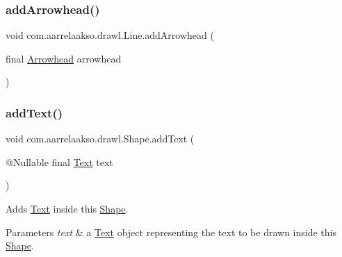 \mbox{\label{classcom_1_1aarrelaakso_1_1drawl_1_1_line_a7c54922855fda2590c962ac8e03c220c}} 
\subsubsection{\texorpdfstring{add\+Arrowhead()}{addArrowhead()}}
{\footnotesize\ttfamily void com.\+aarrelaakso.\+drawl.\+Line.\+add\+Arrowhead (\begin{DoxyParamCaption}\item[{final \hyperlink{classcom_1_1aarrelaakso_1_1drawl_1_1_arrowhead}{Arrowhead}}]{arrowhead }\end{DoxyParamCaption})}

\mbox{\label{classcom_1_1aarrelaakso_1_1drawl_1_1_shape_af6fea9610721de462c18ee640043aba7}} 
\subsubsection{\texorpdfstring{add\+Text()}{addText()}}
{\footnotesize\ttfamily void com.\+aarrelaakso.\+drawl.\+Shape.\+add\+Text (\begin{DoxyParamCaption}\item[{@Nullable final \hyperlink{classcom_1_1aarrelaakso_1_1drawl_1_1_text}{Text}}]{text }\end{DoxyParamCaption})\hspace{0.3cm}{\ttfamily [inherited]}}



Adds \hyperlink{classcom_1_1aarrelaakso_1_1drawl_1_1_text}{Text} inside this \hyperlink{classcom_1_1aarrelaakso_1_1drawl_1_1_shape}{Shape}. 


\begin{DoxyParams}{Parameters}
{\em text} & a \hyperlink{classcom_1_1aarrelaakso_1_1drawl_1_1_text}{Text} object representing the text to be drawn inside this \hyperlink{classcom_1_1aarrelaakso_1_1drawl_1_1_shape}{Shape}. \\
\hline
\end{DoxyParams}
\mbox{\label{classcom_1_1aarrelaakso_1_1drawl_1_1_shape_acebea2aa57031322323c9bf50ee447db}} 
